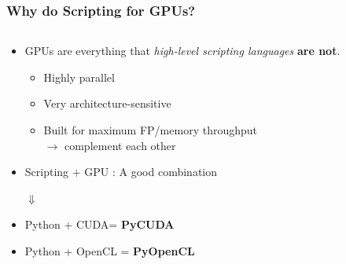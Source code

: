 \documentclass[]{beamer}
\begin{document}
\begin{frame}
\frametitle{Why do Scripting for GPUs?}
\begin{columns}
    \begin{column}{.65\textwidth}
        \begin{itemize}
            \item GPUs are everything that \textit{high-level scripting languages} \textbf{are not}.
                \begin{itemize}
                    \item Highly parallel
                    \item Very architecture-sensitive
                    \item Built for maximum FP/memory throughput \\$\rightarrow$ complement each other   
                \end{itemize}  
            \item \small Scripting $+$ GPU : A good combination 
            \begin{center}$\Downarrow$\end{center}
            \item {}Python + CUDA\footnotemark = \textbf{PyCUDA} 
            \item Python + OpenCL = \textbf{PyOpenCL} 

\end{itemize}
\end{column}
\end{columns}
\end{frame}
\end{document}
